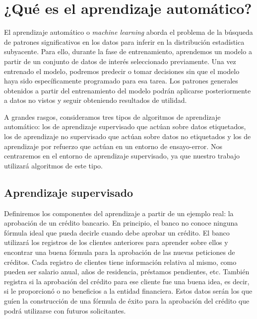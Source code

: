 \documentclass[oneside,openright,titlepage,numbers=noenddot,openany,headinclude,footinclude=true,
cleardoublepage=empty,abstractoff,BCOR=5mm,paper=a4,fontsize=12pt,main=spanish]{scrreprt}
\begin{document}
\section{¿Qué es el aprendizaje automático?}

\label{sec:queaprendizaje}

El aprendizaje automático o \textit{machine learning} aborda el problema de la búsqueda de patrones significativos en los datos para inferir en la distribución estadística subyacente. Para ello, durante la fase de entrenamiento, aprendemos un modelo a partir de un conjunto de datos de interés seleccionado previamente. Una vez entrenado el modelo, podremos predecir o tomar decisiones sin que el modelo haya sido específicamente programado para esa tarea. Los patrones generales obtenidos a partir del entrenamiento del modelo podrán aplicarse posteriormente a datos no vistos y seguir obteniendo resultados de utilidad. 

A grandes rasgos, consideramos tres tipos de algoritmos de aprendizaje automático: los de aprendizaje supervisado que actúan sobre datos etiquetados, los de aprendizaje no supervisado que actúan sobre datos no etiquetados y los de aprendizaje por refuerzo que actúan en un entorno de ensayo-error. Nos centraremos en el entorno de aprendizaje supervisado, ya que nuestro trabajo utilizará algoritmos de este tipo. 

\subsection{Aprendizaje supervisado}

\label{subsec:ejemplobanco}

Definiremos los componentes del aprendizaje a partir de un ejemplo real: la aprobación de un crédito bancario. En principio, el banco no conoce ninguna fórmula ideal que pueda decirle cuando debe aprobar un crédito. El banco utilizará los registros de los clientes anteriores para aprender sobre ellos y encontrar una buena fórmula para la aprobación de las nuevas peticiones de créditos. Cada registro de clientes tiene información relativa al mismo, como pueden ser salario anual, años de residencia, préstamos pendientes, etc. También registra si la aprobación del crédito para ese cliente fue una buena idea, es decir, si le proporcionó o no beneficios a la entidad financiera. Estos datos serán los que guíen la construcción de una fórmula de éxito para la aprobación del crédito que podrá utilizarse con futuros solicitantes.
\end{document}
